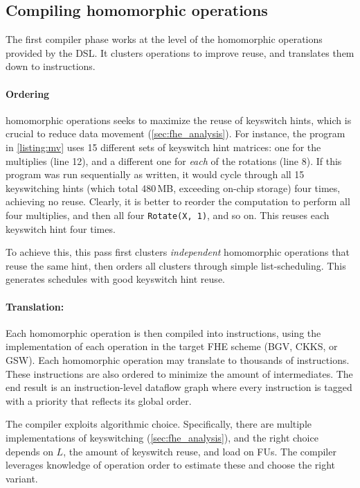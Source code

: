 \subsection{Compiling homomorphic operations}

The first compiler phase works at the level of the homomorphic operations
provided by the DSL. It clusters operations to improve reuse, and translates
them down to instructions.

\paragraph{Ordering} homomorphic operations seeks to maximize
the reuse of keyswitch hints, which is crucial to reduce data movement (\autoref{sec:fhe_analysis}).
For instance, the program in  \autoref{listing:mv}
uses 15 different sets of keyswitch hint matrices: one for the multiplies (line 12), 
and a different one for \emph{each} of the rotations (line 8).
If this program was run sequentially as written, it would cycle through all 15 keyswitching hints
(which total 480\,MB, exceeding on-chip storage) four times, achieving no reuse.
Clearly, it is better to reorder the computation to perform all four multiplies, and then all four \texttt{Rotate(X, 1)}, and so on.
This reuses each keyswitch hint four times.

To achieve this, this pass first clusters \emph{independent} homomorphic operations that reuse the same hint,
then orders all clusters through simple list-scheduling.
This generates schedules with good keyswitch hint reuse.

\paragraph{Translation:} Each homomorphic operation is then compiled into instructions,
using the implementation of each operation in the target FHE scheme (BGV, CKKS, or GSW).
Each homomorphic operation may translate to thousands of instructions.
These instructions are also ordered to minimize the amount of intermediates.
The end result is an instruction-level dataflow graph where every instruction
is tagged with a priority that reflects its global order.

The compiler exploits algorithmic choice.
Specifically, there are multiple implementations of keyswitching (\autoref{sec:fhe_analysis}),
and the right choice depends on $L$, the amount of keyswitch reuse,
and load on FUs.
The compiler leverages knowledge of operation order to estimate these and choose the right variant.

